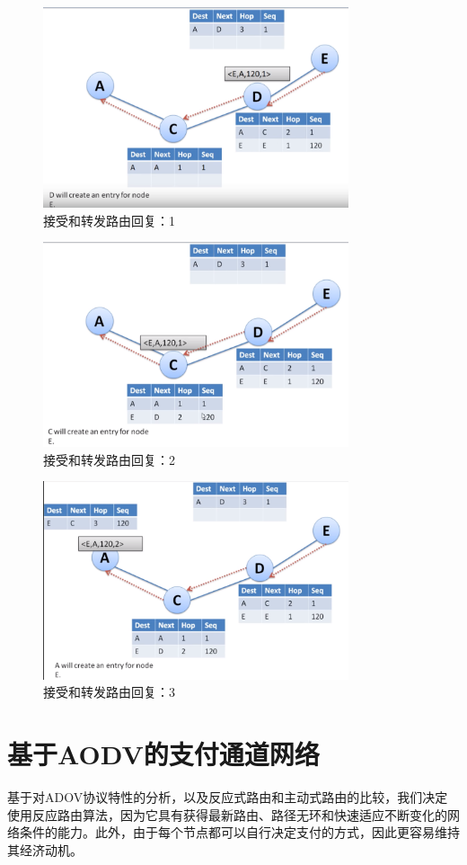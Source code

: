\documentclass[12pt,a4paper]{article}
\begin{document}
\begin{figure}[htb]
\centering
\includegraphics[width=9cm]{receive_route_reply_1}
\caption{接受和转发路由回复：1}
\end{figure}

\begin{figure}[htb]
\centering
\includegraphics[width=9cm]{receive_route_reply_2}
\caption{接受和转发路由回复：2}
\end{figure}

\begin{figure}[htb]
\centering
\includegraphics[width=9cm]{receive_route_reply_3}
\caption{接受和转发路由回复：3}
\end{figure}

\clearpage

\section{基于AODV的支付通道网络}
基于对ADOV协议特性的分析，以及反应式路由和主动式路由的比较，我们决定使用反应路由算法，因为它具有获得最新路由、路径无环和快速适应不断变化的网络条件的能力。此外，由于每个节点都可以自行决定支付的方式，因此更容易维持其经济动机。
\end{document}
